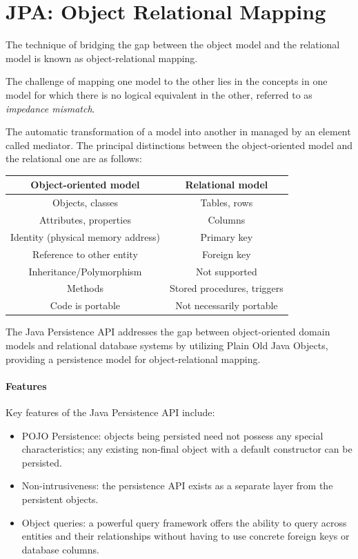 \section{JPA: Object Relational Mapping}

The technique of bridging the gap between the object model and the relational model is known as object-relational mapping. 
\begin{definition}
    The challenge of mapping one model to the other lies in the concepts in one model for which there is no logical equivalent in the other, referred to as \emph{impedance mismatch}.
\end{definition}
The automatic transformation of a model into another in managed by an element called mediator. 
The principal distinctions between the object-oriented model and the relational one are as follows:
\begin{table}[H]
    \centering
    \begin{tabular}{cc}
    \hline
    \textbf{Object-oriented model}     & \textbf{Relational model}   \\ \hline
    Objects, classes                   & Tables, rows                \\
    Attributes, properties             & Columns                     \\
    Identity (physical memory address) & Primary key                 \\
    Reference to other entity          & Foreign key                 \\
    Inheritance/Polymorphism           & Not supported               \\
    Methods                            & Stored procedures, triggers \\
    Code is portable                   & Not necessarily portable    \\ \hline
    \end{tabular}
\end{table}
The Java Persistence API addresses the gap between object-oriented domain models and relational database systems by utilizing Plain Old Java Objects, providing a persistence model for object-relational mapping.

\paragraph*{Features}
Key features of the Java Persistence API include:
\begin{itemize}
    \item POJO Persistence: objects being persisted need not possess any special characteristics; any existing non-final object with a default constructor can be persisted.
    \item Non-intrusiveness: the persistence API exists as a separate layer from the persistent objects.
    \item Object queries: a powerful query framework offers the ability to query across entities and their relationships without having to use concrete foreign keys or database columns.
\end{itemize}

